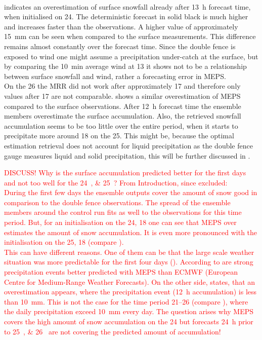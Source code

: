 \\
 indicates an overestimation of surface snowfall already after \SI{13}{\hour} forecast time, when initialised on \SI{24}{\dec}. The deterministic forecast in solid black is much higher and increases faster than the observations. A higher value of approximately \SI{15}{\mm} can be seen when compared to the surface measurements. This difference remains almost constantly over the forecast time. Since the double fence is exposed to wind one might assume a precipitation under-catch at the surface, but by comparing the \SI{10}{\minute} average wind at \SI{13}{\UTC} it shows not to be a relationship between surface snowfall and wind, rather a forecasting error in MEPS. 
\\
On the \SI{26}{\dec} the MRR did not work after approximately \SI{17}{\UTC} and therefore only values after \SI{17}{\UTC} are not comparable.  shows a similar overestimation of MEPS compared to the surface observations. After \SI{12}{\hour} forecast time the ensemble members overestimate the surface accumulation. Also, the retrieved snowfall accumulation seems to be too little over the entire period, when it starts to precipitate more around \SI{18}{\UTC} on the \SI{25}{\dec}. This might be, because the optimal estimation retrieval does not account for liquid precipitation as the double fence gauge measures liquid and solid precipitation, this will be further discussed in .

\textcolor{red}{DISCUSS! Why is the surface accumulation predicted better for the first days and not too well for the \SIlist{24;25}{\dec}? From Introduction, since excluded: \\
	During the first few days the ensemble outputs cover the amount of snow good in comparison to the double fence observations.
	The spread of the ensemble members around the control run fits as well to the observations for this time period. But, for an initialisation on the \SI{24}{\dec}, \SI{18}{\UTC} one can see that  MEPS over estimates the amount of snow accumulation. It is even more pronounced with the initialisation on the \SI{25}{\dec}, \SI{18}{\UTC} (compare ). 
	\\
	This can have different reasons. One of them can be that the large scale weather situation was more predictable for the first four days (). 
	According to \cite{muller_arome-metcoop:_2017} are strong precipitation events better predicted with MEPS than ECMWF (European Centre for Medium-Range Weather Forecasts). On the other side, \cite{muller_arome-metcoop:_2017} states, that an overestimation appears, where the precipitation event (\SI{12}{\hour} accumulation) is less than \SI{10}{\mm}. This is not the case for the time period \SIrange{21}{26}{\dec} (compare ), where the daily precipitation exceed \SI{10}{\mm} every day. The question arises why MEPS covers the high amount of snow accumulation on the \SI{24}{\dec} but forecasts \SI{24}{\hour} prior to \SIlist{25;26}{\dec} are not covering the predicted amount of accumulation!}